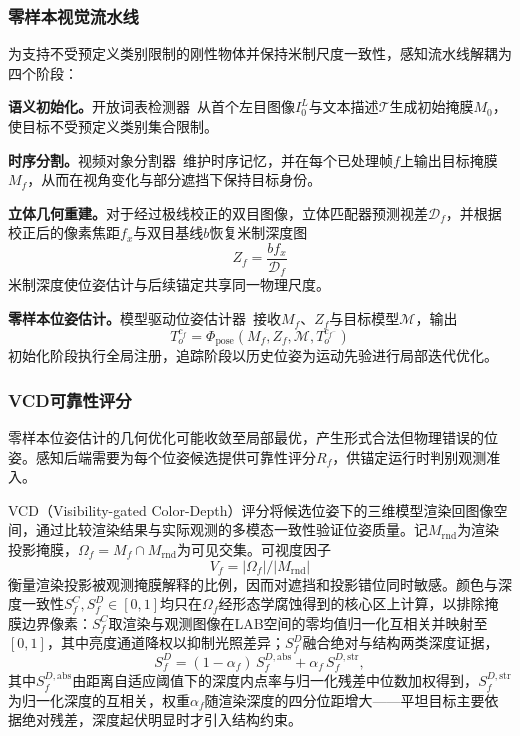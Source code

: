 \documentclass[review]{vgtc}
\begin{document}
\subsubsection{零样本视觉流水线}

为支持不受预定义类别限制的刚性物体并保持米制尺度一致性，感知流水线解耦为四个阶段：

\textbf{语义初始化。}开放词表检测器~\cite{yoloe2025}从首个左目图像$I_0^L$与文本描述$\mathcal{T}$生成初始掩膜$M_0$，使目标不受预定义类别集合限制。

\textbf{时序分割。}视频对象分割器~\cite{cutie2024}维护时序记忆，并在每个已处理帧$f$上输出目标掩膜$M_f$，从而在视角变化与部分遮挡下保持目标身份。

\textbf{立体几何重建。}对于经过极线校正的双目图像，立体匹配器预测视差$\mathcal{D}_f$，并根据校正后的像素焦距$f_x$与双目基线$b$恢复米制深度图
\begin{equation}
Z_f = \frac{b f_x}{\mathcal{D}_f}
\label{eq:depth}
\end{equation}
米制深度使位姿估计与后续锚定共享同一物理尺度。

\textbf{零样本位姿估计。}模型驱动位姿估计器~\cite{foundationpose2023}接收$M_f$、$Z_f$与目标模型$\mathcal{M}$，输出
\begin{equation}
T_o^{c_f} = \Phi_{\mathrm{pose}}(M_f, Z_f, \mathcal{M}, T_o^{c_{f^-}})
\label{eq:pose}
\end{equation}
初始化阶段执行全局注册，追踪阶段以历史位姿为运动先验进行局部迭代优化。

\subsubsection{VCD可靠性评分}

零样本位姿估计的几何优化可能收敛至局部最优，产生形式合法但物理错误的位姿。感知后端需要为每个位姿候选提供可靠性评分$R_f$，供锚定运行时判别观测准入。

VCD（Visibility-gated Color-Depth）评分将候选位姿下的三维模型渲染回图像空间，通过比较渲染结果与实际观测的多模态一致性验证位姿质量。记$M_{\mathrm{rnd}}$为渲染投影掩膜，$\Omega_f = M_f \cap M_{\mathrm{rnd}}$为可见交集。可视度因子
\begin{equation}
V_f = |\Omega_f| / |M_{\mathrm{rnd}}|
\label{eq:visibility}
\end{equation}
衡量渲染投影被观测掩膜解释的比例，因而对遮挡和投影错位同时敏感。颜色与深度一致性$S_f^C, S_f^D \in [0,1]$均只在$\Omega_f$经形态学腐蚀得到的核心区上计算，以排除掩膜边界像素：$S_f^C$取渲染与观测图像在LAB空间的零均值归一化互相关并映射至$[0,1]$，其中亮度通道降权以抑制光照差异；$S_f^D$融合绝对与结构两类深度证据，
\begin{equation}
S_f^D = (1-\alpha_f)\,S_f^{D,\mathrm{abs}} + \alpha_f\,S_f^{D,\mathrm{str}},
\label{eq:depth-score}
\end{equation}
其中$S_f^{D,\mathrm{abs}}$由距离自适应阈值下的深度内点率与归一化残差中位数加权得到，$S_f^{D,\mathrm{str}}$为归一化深度的互相关，权重$\alpha_f$随渲染深度的四分位距增大——平坦目标主要依据绝对残差，深度起伏明显时才引入结构约束。
\end{document}
